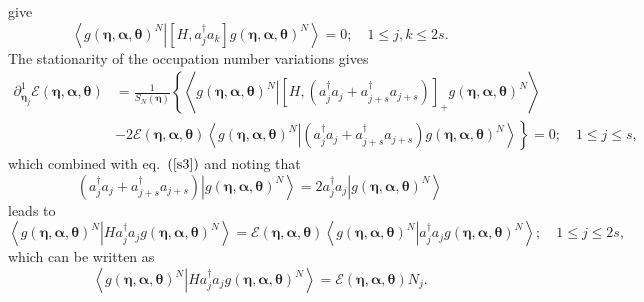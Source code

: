 \documentclass[aps,preprint]{revtex4}%
\begin{document}
give
\begin{equation}
\left\langle \left.  g\left(  \boldsymbol{\eta},\boldsymbol{\alpha
},\boldsymbol{\theta}\right)  ^{N}\right\vert \left[  H,a_{j}^{\dagger}%
a_{k}\right]  g\left(  \boldsymbol{\eta},\boldsymbol{\alpha}%
,\boldsymbol{\theta}\right)  ^{N}\right\rangle =0;\quad1\leq j,k\leq2s.
\label{s3}%
\end{equation}
The stationarity of the occupation number variations gives
\begin{align}
\partial_{\boldsymbol{\eta}_{j}}^{1}\mathcal{E}\left(  \boldsymbol{\eta
},\boldsymbol{\alpha},\boldsymbol{\theta}\right)   &  =\frac{1}{S_{N}\left(
\boldsymbol{\eta}\right)  }\left\{  \left\langle \left.  g\left(
\boldsymbol{\eta},\boldsymbol{\alpha},\boldsymbol{\theta}\right)
^{N}\right\vert \left[  H,\left(  a_{j}^{\dagger}a_{j}+a_{j+s}^{\dagger
}a_{j+s}\right)  \right]  _{+}g\left(  \boldsymbol{\eta},\boldsymbol{\alpha
},\boldsymbol{\theta}\right)  ^{N}\right\rangle \right. \nonumber\\
&  -\left.  2\mathcal{E}\left(  \boldsymbol{\eta},\boldsymbol{\alpha
},\boldsymbol{\theta}\right)  \left\langle \left.  g\left(  \boldsymbol{\eta
},\boldsymbol{\alpha},\boldsymbol{\theta}\right)  ^{N}\right\vert \left(
a_{j}^{\dagger}a_{j}+a_{j+s}^{\dagger}a_{j+s}\right)  g\left(
\boldsymbol{\eta},\boldsymbol{\alpha},\boldsymbol{\theta}\right)
^{N}\right\rangle \right\}  =0;\quad1\leq j\leq s,
\end{align}
which combined with eq.\ $\left(  \ref{s3}\right)  $ and noting that
\begin{equation}
\left(  a_{j}^{\dagger}a_{j}+a_{j+s}^{\dagger}a_{j+s}\right)  \left\vert
g\left(  \boldsymbol{\eta},\boldsymbol{\alpha},\boldsymbol{\theta}\right)
^{N}\right\rangle =2a_{j}^{\dagger}a_{j}\left\vert g\left(  \boldsymbol{\eta
},\boldsymbol{\alpha},\boldsymbol{\theta}\right)  ^{N}\right\rangle
\end{equation}
leads to
\begin{equation}
\left\langle \left.  g\left(  \boldsymbol{\eta},\boldsymbol{\alpha
},\boldsymbol{\theta}\right)  ^{N}\right\vert Ha_{j}^{\dagger}a_{j}g\left(
\boldsymbol{\eta},\boldsymbol{\alpha},\boldsymbol{\theta}\right)
^{N}\right\rangle =\mathcal{E}\left(  \boldsymbol{\eta},\boldsymbol{\alpha
},\boldsymbol{\theta}\right)  \left\langle \left.  g\left(  \boldsymbol{\eta
},\boldsymbol{\alpha},\boldsymbol{\theta}\right)  ^{N}\right\vert
a_{j}^{\dagger}a_{j}g\left(  \boldsymbol{\eta},\boldsymbol{\alpha
},\boldsymbol{\theta}\right)  ^{N}\right\rangle ;\quad1\leq j\leq2s,
\end{equation}
which can be written as
\begin{equation}
\left\langle \left.  g\left(  \boldsymbol{\eta},\boldsymbol{\alpha
},\boldsymbol{\theta}\right)  ^{N}\right\vert Ha_{j}^{\dagger}a_{j}g\left(
\boldsymbol{\eta},\boldsymbol{\alpha},\boldsymbol{\theta}\right)
^{N}\right\rangle =\mathcal{E}\left(  \boldsymbol{\eta},\boldsymbol{\alpha
},\boldsymbol{\theta}\right)  N_{j}.
\end{equation}
\end{document}
